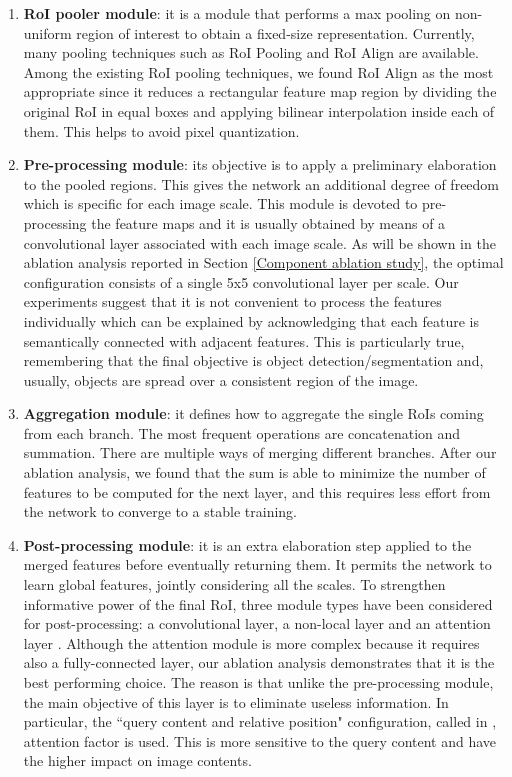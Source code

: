 \documentclass[10pt,conference,a4paper]{IEEEtran}
\begin{document}
\begin{enumerate}
	\item \textbf{RoI pooler module}:
	it is a module that performs a max pooling on non-uniform region of interest to obtain a fixed-size representation.
	Currently, many pooling techniques such as RoI Pooling \cite{girshick2015fast} and RoI Align \cite{he2017mask} are available.
	Among the existing RoI pooling techniques, we found RoI Align \cite{he2017mask} as the most appropriate since it reduces a rectangular feature map region by dividing the original RoI in equal boxes and applying bilinear interpolation inside each of them. This helps to avoid pixel quantization.
	\item \textbf{Pre-processing module}:
	its objective is to apply a preliminary elaboration to the pooled regions.
	This gives the network an additional degree of freedom which is specific for each image scale.
	This module is devoted to pre-processing the feature maps and it is usually obtained by means of a convolutional layer associated with each image scale.
	As will be shown in the ablation analysis reported in Section \ref{Component ablation study}, the optimal configuration consists of a single 5x5 convolutional layer per scale.
	Our experiments suggest that it is not convenient to process the features individually which can be explained by acknowledging that each feature is semantically connected with adjacent features. This is particularly true, remembering that the final objective is object detection/segmentation and, usually, objects are spread over a consistent region of the image.
	\item \textbf{Aggregation module}:
	it defines how to aggregate the single RoIs coming from each branch.
	The most frequent operations are concatenation and summation.
	There are multiple ways of merging different branches.
	After our ablation analysis, we found that the sum is able to minimize the number of features to be computed for the next layer, and this requires less effort from the network to converge to a stable training.
	\item \textbf{Post-processing module}:
	it is an extra elaboration step applied to the merged features before eventually returning them.
	It permits the network to learn global features, jointly considering all the scales.
	To strengthen informative power of the final RoI, three module types have been considered for post-processing: a convolutional layer, a non-local layer \cite{wang2018non} and an attention layer \cite{zhu2019empirical}.
	Although the attention module is more complex because it requires also a fully-connected layer, our ablation analysis demonstrates that it is the best performing choice.
	The reason is that unlike the pre-processing module, the main objective of this layer is to eliminate useless information.
	In particular, the ``query content and relative position" configuration, called  in \cite{zhu2019empirical},  attention factor is used. This is more sensitive to the query content and have the higher impact on image contents.
\end{enumerate}
\end{document}
